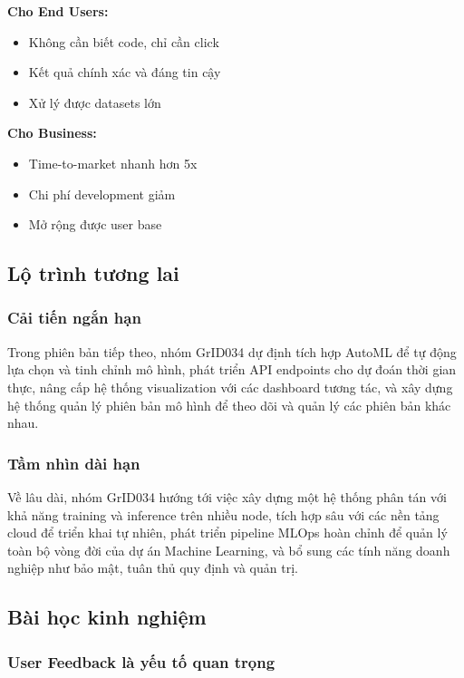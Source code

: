 \textbf{Cho End Users:}
\begin{itemize}
    \item Không cần biết code, chỉ cần click
    \item Kết quả chính xác và đáng tin cậy
    \item Xử lý được datasets lớn
\end{itemize}

\textbf{Cho Business:}
\begin{itemize}
    \item Time-to-market nhanh hơn 5x
    \item Chi phí development giảm
    \item Mở rộng được user base
\end{itemize}

\subsection{Lộ trình tương lai}

\subsubsection{Cải tiến ngắn hạn }

Trong phiên bản tiếp theo, nhóm GrID034 dự định tích hợp AutoML để tự động lựa chọn và tinh chỉnh mô hình, phát triển API endpoints cho dự đoán thời gian thực, nâng cấp hệ thống visualization với các dashboard tương tác, và xây dựng hệ thống quản lý phiên bản mô hình để theo dõi và quản lý các phiên bản khác nhau.

\subsubsection{Tầm nhìn dài hạn }

Về lâu dài, nhóm GrID034 hướng tới việc xây dựng một hệ thống phân tán với khả năng training và inference trên nhiều node, tích hợp sâu với các nền tảng cloud để triển khai tự nhiên, phát triển pipeline MLOps hoàn chỉnh để quản lý toàn bộ vòng đời của dự án Machine Learning, và bổ sung các tính năng doanh nghiệp như bảo mật, tuân thủ quy định và quản trị.

\subsection{Bài học kinh nghiệm}


\subsubsection{User Feedback là yếu tố quan trọng}

